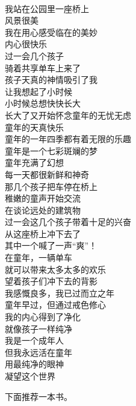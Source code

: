 \begin{poem}[一个永远活在童年的人]
    \begin{multicols}{2}
        \centering~\\
        我站在公园里一座桥上 \\ 风景很美 \\ 我在用心感受临在的美妙 \\ 内心很快乐 \\ 过一会几个孩子 \\ 骑着共享单车上来了 \\ 孩子天真的神情吸引了我 \\ 让我想起了小时候 \\ 小时候总想快快长大 \\ 长大了又开始怀念童年的无忧无虑 \\ 童年的天真快乐 \\ 童年的一年四季都有着无限的乐趣 \\ 童年是一个七彩斑斓的梦 \\ 童年充满了幻想 \\ 每一天都很新鲜和神奇 \\ 那几个孩子把车停在桥上 \\ 稚嫩的童声开始交流 \\ 在谈论远处的建筑物 \\ 过一会这几个孩子带着十足的兴奋 \\ 从这座桥上冲下去了 \\ 其中一个喊了一声“爽”！ \\ 在童年，一辆单车 \\ 就可以带来太多太多的欢乐 \\ 望着孩子们冲下去的背影 \\ 我感慨良多，我已过而立之年 \\ 童年早过，但通过戒色修心 \\ 我的内心得到了净化 \\ 就像孩子一样纯净 \\ 我是一个成年人 \\ 但我永远活在童年 \\ 用最纯净的眼神 \\ 凝望这个世界
    \end{multicols}
\end{poem}

下面推荐一本书。

